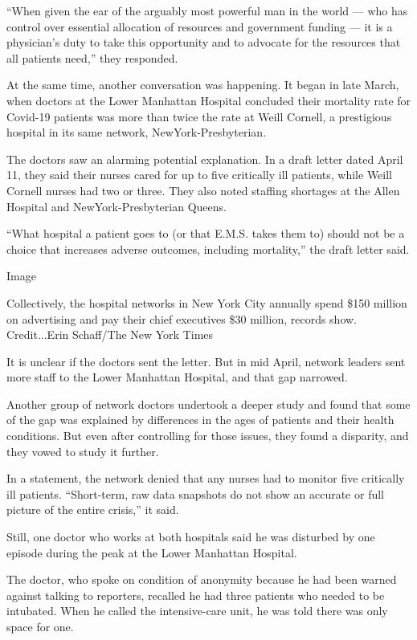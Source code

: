 ``When given the ear of the arguably most powerful man in the world ---
who has control over essential allocation of resources and government
funding --- it is a physician's duty to take this opportunity and to
advocate for the resources that all patients need,'' they responded.

At the same time, another conversation was happening. It began in late
March, when doctors at the Lower Manhattan Hospital concluded their
mortality rate for Covid-19 patients was more than twice the rate at
Weill Cornell, a prestigious hospital in its same network,
NewYork-Presbyterian.

The doctors saw an alarming potential explanation. In a draft letter
dated April 11, they said their nurses cared for up to five critically
ill patients, while Weill Cornell nurses had two or three. They also
noted staffing shortages at the Allen Hospital and NewYork-Presbyterian
Queens.

``What hospital a patient goes to (or that E.M.S. takes them to) should
not be a choice that increases adverse outcomes, including mortality,''
the draft letter said.

Image

Collectively, the hospital networks in New York City annually spend
\$150 million on advertising and pay their chief executives \$30
million, records show. Credit...Erin Schaff/The New York Times

It is unclear if the doctors sent the letter. But in mid April, network
leaders sent more staff to the Lower Manhattan Hospital, and that gap
narrowed.

Another group of network doctors undertook a deeper study and found that
some of the gap was explained by differences in the ages of patients and
their health conditions. But even after controlling for those issues,
they found a disparity, and they vowed to study it further.

In a statement, the network denied that any nurses had to monitor five
critically ill patients. ``Short-term, raw data snapshots do not show an
accurate or full picture of the entire crisis,'' it said.

Still, one doctor who works at both hospitals said he was disturbed by
one episode during the peak at the Lower Manhattan Hospital.

The doctor, who spoke on condition of anonymity because he had been
warned against talking to reporters, recalled he had three patients who
needed to be intubated. When he called the intensive-care unit, he was
told there was only space for one.

